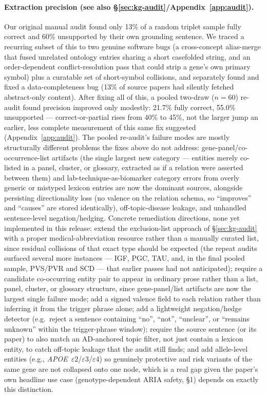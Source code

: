 \documentclass{article}
\begin{document}
\paragraph{Extraction precision (see also \S\ref{sec:kg-audit}/Appendix~\ref{app:audit}).} Our original manual audit found only 13\% of a random triplet sample fully correct and 60\% unsupported by their own grounding sentence. We traced a recurring subset of this to two genuine software bugs (a cross-concept alias-merge that fused unrelated ontology entries sharing a short casefolded string, and an order-dependent conflict-resolution pass that could strip a gene's own primary symbol) plus a curatable set of short-symbol collisions, and separately found and fixed a data-completeness bug (13\% of source papers had silently fetched abstract-only content). After fixing all of this, a pooled two-draw ($n{=}60$) re-audit found precision improved only modestly: 21.7\% fully correct, 55.0\% unsupported --- correct-or-partial rises from 40\% to 45\%, not the larger jump an earlier, less complete measurement of this same fix suggested (Appendix~\ref{app:audit}). The pooled re-audit's failure modes are mostly structurally different problems the fixes above do not address: gene-panel/co-occurrence-list artifacts (the single largest new category --- entities merely co-listed in a panel, cluster, or glossary, extracted as if a relation were asserted between them) and lab-technique-as-biomarker category errors from overly generic or mistyped lexicon entries are now the dominant sources, alongside persisting directionality loss (no valence on the relation schema, so ``improves'' and ``causes'' are stored identically), off-topic-disease leakage, and unhandled sentence-level negation/hedging. Concrete remediation directions, none yet implemented in this release: extend the exclusion-list approach of \S\ref{sec:kg-audit} with a proper medical-abbreviation resource rather than a manually curated list, since residual collisions of that exact type should be expected (the repeat audits surfaced several more instances --- IGF, PGC, TAU, and, in the final pooled sample, PVS/PVR and SCD --- that earlier passes had not anticipated); require a candidate co-occurring entity pair to appear in ordinary prose rather than a list, panel, cluster, or glossary structure, since gene-panel/list artifacts are now the largest single failure mode; add a signed valence field to each relation rather than inferring it from the trigger phrase alone; add a lightweight negation/hedge detector (e.g.\ reject a sentence containing ``no'', ``not'', ``unclear'', or ``remains unknown'' within the trigger-phrase window); require the source sentence (or its paper) to also match an AD-anchored topic filter, not just contain a lexicon entity, to catch off-topic leakage that the audit still finds; and add allele-level entities (e.g., \textit{APOE}~$\varepsilon2$/$\varepsilon3$/$\varepsilon4$) so genuinely protective and risk variants of the same gene are not collapsed onto one node, which is a real gap given the paper's own headline use case (genotype-dependent ARIA safety, \S1) depends on exactly this distinction.
\end{document}
